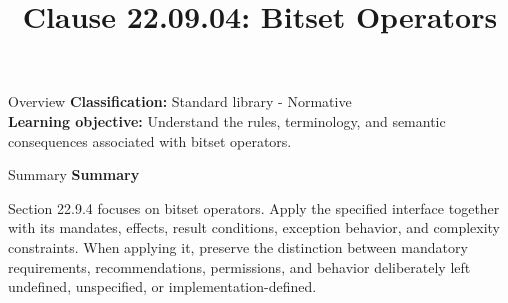 \documentclass[10pt,letterpaper]{article}
\title{Clause 22.09.04: Bitset Operators}
\author{}
\date{}
\begin{document}
\maketitle
\begin{CornellOverviewBox}{Overview}
\textbf{Classification:} Standard library - Normative\\[2pt]
\textbf{Learning objective:} Understand the rules, terminology, and semantic consequences associated with bitset operators.
\end{CornellOverviewBox}\begin{CornellSummaryBox}{Summary}
{\sffamily\bfseries\color{Accent} Summary}\par\vspace{3pt}Section 22.9.4 focuses on bitset operators. Apply the specified interface together with its mandates, effects, result conditions, exception behavior, and complexity constraints. When applying it, preserve the distinction between mandatory requirements, recommendations, permissions, and behavior deliberately left undefined, unspecified, or implementation-defined.
\end{CornellSummaryBox}
\end{document}
